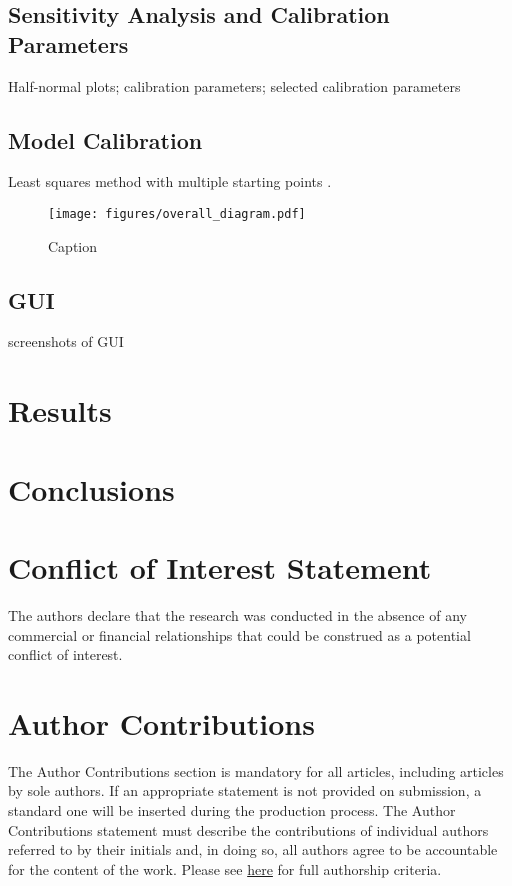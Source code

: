 \documentclass[utf8]{frontiersHLTH} %
\begin{document}
\subsection{Sensitivity Analysis and Calibration Parameters}
Half-normal plots; calibration parameters; selected calibration parameters

\subsection{Model Calibration}
Least squares method with multiple starting points \cite{reali2017optimization}.
\begin{figure}[!ht]
    \centering
    \texttt{[image: figures/overall\_diagram.pdf]}
    \caption{Caption}
    \label{fig:overall}
\end{figure}

\subsection{GUI}
screenshots of GUI

\section{Results}

\section{Conclusions}

\section*{Conflict of Interest Statement}

The authors declare that the research was conducted in the absence of any commercial or financial relationships that could be construed as a potential conflict of interest.

\section*{Author Contributions}

The Author Contributions section is mandatory for all articles, including articles by sole authors. If an appropriate statement is not provided on submission, a standard one will be inserted during the production process. The Author Contributions statement must describe the contributions of individual authors referred to by their initials and, in doing so, all authors agree to be accountable for the content of the work. Please see  \href{http://home.frontiersin.org/about/author-guidelines#AuthorandContributors}{here} for full authorship criteria.
\end{document}
